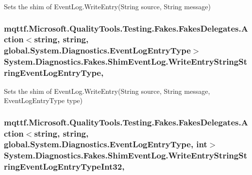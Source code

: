 Sets the shim of Event\-Log.\-Write\-Entry(\-String source, String message)

\hypertarget{class_system_1_1_diagnostics_1_1_fakes_1_1_shim_event_log_af02b7a37a61cc2be6038ae1dd53c4a2d}{
\subsubsection[{Write\-Entry\-String\-String\-Event\-Log\-Entry\-Type}]{\setlength{\rightskip}{0pt plus 5cm}mqttf.\-Microsoft.\-Quality\-Tools.\-Testing.\-Fakes.\-Fakes\-Delegates.\-Action$<$string, string, global.\-System.\-Diagnostics.\-Event\-Log\-Entry\-Type$>$ System.\-Diagnostics.\-Fakes.\-Shim\-Event\-Log.\-Write\-Entry\-String\-String\-Event\-Log\-Entry\-Type\hspace{0.3cm}{\ttfamily [static]}, {\ttfamily [set]}}}\label{class_system_1_1_diagnostics_1_1_fakes_1_1_shim_event_log_af02b7a37a61cc2be6038ae1dd53c4a2d}


Sets the shim of Event\-Log.\-Write\-Entry(\-String source, String message, Event\-Log\-Entry\-Type type)

\hypertarget{class_system_1_1_diagnostics_1_1_fakes_1_1_shim_event_log_a5bcb6de42d63157061dda9ff6d81bf8c}{
\subsubsection[{Write\-Entry\-String\-String\-Event\-Log\-Entry\-Type\-Int32}]{\setlength{\rightskip}{0pt plus 5cm}mqttf.\-Microsoft.\-Quality\-Tools.\-Testing.\-Fakes.\-Fakes\-Delegates.\-Action$<$string, string, global.\-System.\-Diagnostics.\-Event\-Log\-Entry\-Type, int$>$ System.\-Diagnostics.\-Fakes.\-Shim\-Event\-Log.\-Write\-Entry\-String\-String\-Event\-Log\-Entry\-Type\-Int32\hspace{0.3cm}{\ttfamily [static]}, {\ttfamily [set]}}}\label{class_system_1_1_diagnostics_1_1_fakes_1_1_shim_event_log_a5bcb6de42d63157061dda9ff6d81bf8c}


